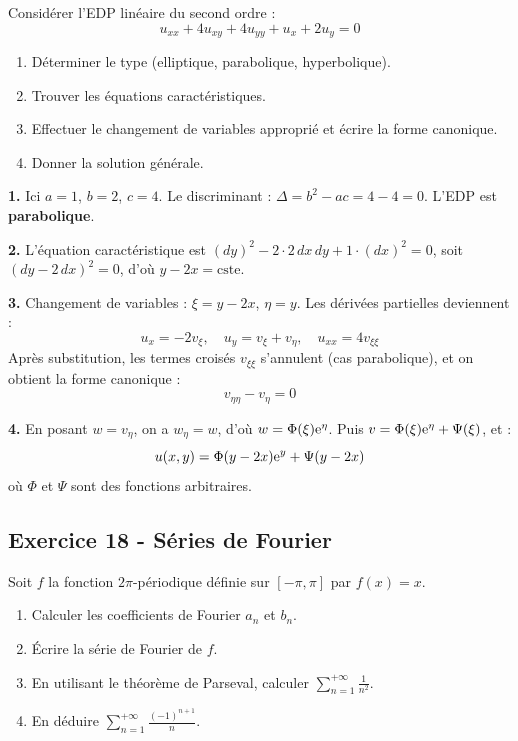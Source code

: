 \documentclass[12pt,a4paper]{article}
\begin{document}
\begin{boiteexercice}
Considérer l'EDP linéaire du second ordre :
\[
u_{xx} + 4u_{xy} + 4u_{yy} + u_x + 2u_y = 0
\]
\begin{enumerate}
  \item Déterminer le type (elliptique, parabolique, hyperbolique).
  \item Trouver les équations caractéristiques.
  \item Effectuer le changement de variables approprié et écrire la forme canonique.
  \item Donner la solution générale.
\end{enumerate}
\end{boiteexercice}

\begin{boitecorrige}
\textbf{1.} Ici $a = 1$, $b = 2$, $c = 4$. Le discriminant : $\Delta = b^2 - ac = 4 - 4 = 0$. L'EDP est \textbf{parabolique}.

\textbf{2.} L'équation caractéristique est $(dy)^2 - 2\cdot 2\,dx\,dy + 1\cdot(dx)^2 = 0$, soit $(dy - 2\,dx)^2 = 0$, d'où $y - 2x = \text{cste}$.

\textbf{3.} Changement de variables : $\xi = y - 2x$, $\eta = y$. Les dérivées partielles deviennent :
\[
u_x = -2v_\xi, \quad u_y = v_\xi + v_\eta, \quad u_{xx} = 4v_{\xi\xi}
\]
Après substitution, les termes croisés $v_{\xi\xi}$ s'annulent (cas parabolique), et on obtient la forme canonique :
\[
v_{\eta\eta} - v_\eta = 0
\]

\textbf{4.} En posant $w = v_\eta$, on a $w_\eta = w$, d'où $w = \Phi(\xi)\mathrm{e}^\eta$. Puis $v = \Phi(\xi)\mathrm{e}^\eta + \Psi(\xi)$, et :
\[
u(x,y) = \Phi(y-2x)\mathrm{e}^y + \Psi(y-2x)
\]
où $\Phi$ et $\Psi$ sont des fonctions arbitraires.
\end{boitecorrige}

\subsection*{Exercice 18 - Séries de Fourier \niveau{\moyen}}

\begin{boiteexercice}
Soit $f$ la fonction $2\pi$-périodique définie sur $[-\pi, \pi]$ par $f(x) = x$.
\begin{enumerate}
  \item Calculer les coefficients de Fourier $a_n$ et $b_n$.
  \item Écrire la série de Fourier de $f$.
  \item En utilisant le théorème de Parseval, calculer $\displaystyle\sum_{n=1}^{+\infty} \frac{1}{n^2}$.
  \item En déduire $\displaystyle\sum_{n=1}^{+\infty} \frac{(-1)^{n+1}}{n}$.
\end{enumerate}
\end{boiteexercice}
\end{document}
